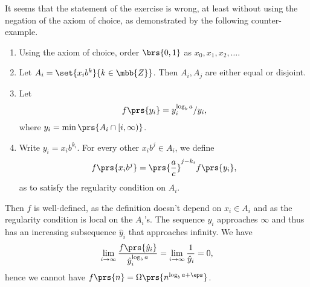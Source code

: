 \documentclass[oneside]{scrbook}
\theoremstyle{definition}
\begin{document}
\begin{exercise}
It seems that the statement of the exercise is wrong, at least without using the negation of the axiom of choice, as demonstrated by the following counter-example.

\begin{enumerate}
\item
Using the axiom of choice, order $\brs{0,1}$ as $x_0, x_1, x_2, \ldots$.
\item
Let $A_i = \set{x_i b^k}{k \in \mbb{Z}}$. Then $A_i, A_j$ are either equal or disjoint.
\item
Let
\begin{align*}
f\prs{y_i} = y_i^{\log_b a} / y_i \text{,}
\end{align*}
where $y_i = \min\prs{A_i \cap \left[i, \infty\right)}$.
\item
Write $y_i = x_i b^{k_i}$. For every other $x_i b^j \in A_i$, we define
\begin{align*}
f\prs{x_i b^j} = \prs{\frac{a}{c}}^{j - k_i} f\prs{y_i} \text{,}
\end{align*}
as to satisfy the regularity condition on $A_i$.
\end{enumerate}

Then $f$ is well-defined, as the definition doesn't depend on $x_i \in A_i$ and as the regularity condition is local on the $A_i$'s. The sequence $y_i$ approaches $\infty$ and thus has an increasing subsequence $\hat{y}_i$ that approaches infinity.
We have
\begin{align*}
\lim_{i \to \infty} \frac{f\prs{\hat{y}_i}}{\hat{y}_i^{\log_b a}} = \lim_{i \to \infty} \frac{1}{\hat{y}_i} = 0 \text{,}
\end{align*}
hence we cannot have $f\prs{n} = \Omega\prs{n^{\log_b a + \eps}}$.

\begin{comment}
Let \[f \colon \left[n_0, \infty \right) \to \mbb{R}_+\] such that $f$ satisfies the regularity condition
\[a f\prs{n/b} \leq c f\prs{n}\]
for all $n \geq n_1$, for some $n_1 \geq n_0$.
Let $f_1 \coloneqq \left. f \right\vert_{\left[ n_1, \infty \right)}$, which then satisfies the regularity condition for all $n$. Since they are asymptotically the same, it suffices to show that there's $\eps > 0$ such that $f_1\prs{n} = \Omega \prs{n^{\log_b a + \eps}}$.


\end{comment}
\end{exercise}
\end{document}
